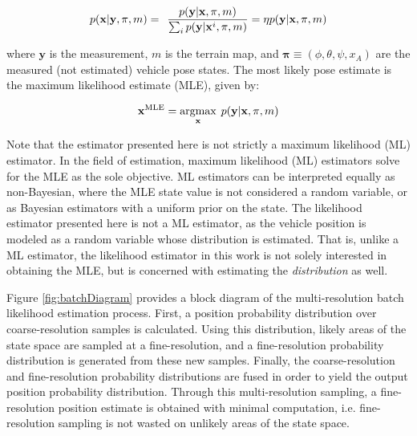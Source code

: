 \begin{equation}
p(\mathbf{x} | \mathbf{y}, \mathbf{\pi}, m ) = \hspace{1ex} \frac{p(\mathbf{y} | \mathbf{x}, \mathbf{\pi}, m)}{\sum_{i} p(\mathbf{y}|\mathbf{x}^{i}, \mathbf{\pi}, m)} = \eta p(\mathbf{y} | \mathbf{x}, \mathbf{\pi}, m)
\label{eq:likelihood}
\end{equation}

\noindent where $\mathbf{y}$ is the measurement, $m$ is the terrain map, and $\mathbf{\pi} \equiv (\phi, \theta, \psi, x_A)$ are the measured (not estimated) vehicle pose states.  The most likely pose estimate is the maximum likelihood estimate (MLE), given by:

\begin{equation}
\mathbf{x}^{\text{MLE}} = \underset{\mathbf{x}}{\text{argmax}} \hspace{1ex} p(\mathbf{y} | \mathbf{x}, \mathbf{\pi}, m)
\label{eq:ML}
\end{equation}
%

Note that the estimator presented here is not strictly a maximum likelihood (ML) estimator.
In the field of estimation, maximum likelihood (ML) estimators solve for the MLE as the sole objective.
ML estimators can be interpreted equally as non-Bayesian, where the MLE state value is not considered a random variable, or as Bayesian estimators with a uniform prior on the state.
The likelihood estimator presented here is not a ML estimator, as the vehicle position is modeled as a random variable whose distribution is estimated.
That is, unlike a ML estimator, the likelihood estimator in this work is not solely interested in obtaining the MLE, but is concerned with estimating the \emph{distribution} as well.

Figure \ref{fig:batchDiagram} provides a block diagram of the multi-resolution batch likelihood estimation process.
First, a position probability distribution over coarse-resolution samples is calculated.
Using this distribution, likely areas of the state space are sampled at a fine-resolution, and a fine-resolution probability distribution is generated from these new samples.
Finally, the coarse-resolution and fine-resolution probability distributions are fused in order to yield the output position probability distribution.
Through this multi-resolution sampling, a fine-resolution position estimate is obtained with minimal computation, i.e. fine-resolution sampling is not wasted on unlikely areas of the state space.

